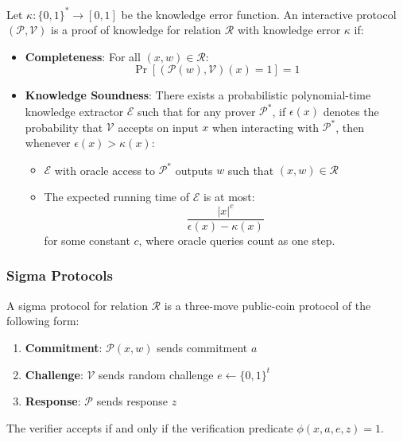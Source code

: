 \begin{definition}
\label{def:pok}
Let $\kappa: \{0,1\}^* \rightarrow [0,1]$ be the knowledge error function. An interactive protocol $(\mathcal{P}, \mathcal{V})$ is a proof of knowledge for relation $\mathcal{R}$ with knowledge error $\kappa$ if:

\begin{itemize}
    \item \textbf{Completeness}: For all $(x,w) \in \mathcal{R}$:
    $$\Pr[(\mathcal{P}(w), \mathcal{V})(x) = 1] = 1$$
    
    \item \textbf{Knowledge Soundness}: There exists a probabilistic polynomial-time knowledge extractor $\mathcal{E}$ such that for any prover $\mathcal{P}^*$, if $\epsilon(x)$ denotes the probability that $\mathcal{V}$ accepts on input $x$ when interacting with $\mathcal{P}^*$, then whenever $\epsilon(x) > \kappa(x)$:
    \begin{itemize}
        \item $\mathcal{E}$ with oracle access to $\mathcal{P}^*$ outputs $w$ such that $(x,w) \in \mathcal{R}$
        \item The expected running time of $\mathcal{E}$ is at most:
        $$\frac{|x|^c}{\epsilon(x) - \kappa(x)}$$
        for some constant $c$, where oracle queries count as one step.
    \end{itemize}
\end{itemize}
\end{definition}

\subsubsection{Sigma Protocols}

\begin{definition}
\label{def:sigma}
A sigma protocol for relation $\mathcal{R}$ is a three-move public-coin protocol of the following form:
\begin{enumerate}
    \item \textbf{Commitment}: $\mathcal{P}(x,w)$ sends commitment $a$
    \item \textbf{Challenge}: $\mathcal{V}$ sends random challenge $e \leftarrow \{0,1\}^t$
    \item \textbf{Response}: $\mathcal{P}$ sends response $z$
\end{enumerate}

The verifier accepts if and only if the verification predicate $\phi(x,a,e,z) = 1$. 
\end{definition}


